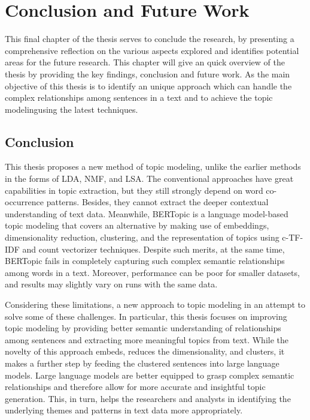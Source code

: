 \chapter{Conclusion and Future Work}

\label{Chapter6}


This final chapter of the thesis serves to conclude the research, by presenting a comprehensive reflection on the various aspects explored and identifies potential 
areas for the future research. This chapter will give an quick overview of the thesis by providing  the key findings, conclusion and future work. As the main
objective of this thesis is to identify an unique approach which can handle the complex relationships among sentences in a text and to achieve the 
topic modelingusing the latest techniques.

\section{Conclusion}

This thesis proposes a new method of topic modeling, unlike the earlier methods in the forms of LDA, NMF, and LSA. 
The conventional approaches have great capabilities in topic extraction, but they still strongly depend on word co-occurrence patterns.
 Besides, they cannot extract the deeper contextual understanding of text data. Meanwhile, BERTopic is a language model-based topic modeling 
 that covers an alternative by making use of embeddings, dimensionality reduction, clustering, and the representation of topics using c-TF-IDF and count 
vectorizer techniques. Despite such merits, at the same time, BERTopic fails in completely capturing such complex semantic relationships among words in
 a text. Moreover, performance can be poor for smaller datasets, and results may slightly vary on runs with the same data.

Considering these limitations, a new approach to topic modeling in an attempt to solve some of these challenges.
In particular, this thesis focuses on improving topic modeling by providing better semantic understanding of relationships 
among sentences and extracting more meaningful topics from text. While the novelty of this approach embeds, reduces the
dimensionality, and clusters, it makes a further step by feeding the clustered sentences into large language models. 
Large language models are better equipped to grasp complex semantic relationships and therefore allow for more 
accurate and insightful topic generation. This, in turn, helps the researchers and analysts in identifying the 
underlying themes and patterns in text data more appropriately.

